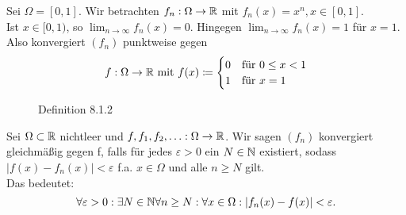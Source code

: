 \begin{subexample}
	Sei $ \Omega = [0, 1] $. Wir betrachten $ f_n: \Omega \to \mathbb{R}  $ mit $ f_n(x) = x^n, x \in [0, 1] $.\\
	Ist $ x \in [0, 1) $, so $ \lim_{n \to \infty} f_n(x) = 0 $. Hingegen $ \lim_{n \to \infty} f_n(x) = 1 $ für $ x = 1 $.
	Also konvergiert $ (f_n) $ punktweise gegen
	\[
		f: \Omega \to \mathbb{R} \text{ mit } f(x) \coloneqq \begin{cases}
			0 & \text{für } 0\leq x<1\\
			1 & \text{für } x = 1
		\end{cases}
	\]
\end{subexample}
\begin{figure}[!ht]
	\centering
	\caption{Definition 8.1.2}
	\label{Definition8.1.2}
\end{figure}

\begin{subdefinition}
	Sei $ \Omega \subset \mathbb{R}  $ nichtleer und $ f, f_1, f_2, \dotsc : \Omega \to \mathbb{R}  $.
	Wir sagen $ (f_n) $ {\color{yellow} konvergiert gleichmäßig gegen} f, falls für jedes $ \varepsilon > 0 $ ein $ N \in \mathbb{N}  $ existiert, sodass $ |f(x) - f_n(x)| < \varepsilon  $ f.a. $ x \in \Omega $ und alle $ n \geq N $ gilt.\\
	Das bedeutet:
	\[
		\forall \varepsilon > 0: \exists N \in \mathbb{N} \forall n \geq N : \forall x \in \Omega: |f_n(x) - f(x)| < \varepsilon .
	\]
\end{subdefinition}

